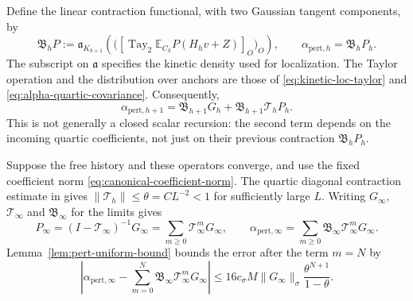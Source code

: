 \documentclass[11pt]{article}
\newcommand{\E}{\mathbb E}
\newcommand{\Tay}{\operatorname{Tay}}
\numberwithin{equation}{section}
\theoremstyle{definition}
\theoremstyle{plain}
\begin{document}
Define the linear contraction functional, with two Gaussian
tangent components, by
\begin{equation}
 \mathfrak B_hP
 :=\mathfrak a_{K_{h+1}}\!\left(
       \bigl([\Tay_2\E_{C_h}P(H_hv+Z)]_O\bigr)_O\right),
 \qquad \alpha_{\mathrm{pert},h}=\mathfrak B_hP_h.
 \label{eq:quartic-history-contraction}
\end{equation}
The subscript on $\mathfrak a$ specifies the kinetic density
used for localization.  The Taylor operation and the distribution
over anchors are those of \eqref{eq:kinetic-loc-taylor} and
\eqref{eq:alpha-quartic-covariance}.  Consequently,
\begin{equation}
 \alpha_{\mathrm{pert},h+1}
   =\mathfrak B_{h+1}G_h
       +\mathfrak B_{h+1}\mathcal T_hP_h.
 \label{eq:quartic-history-alpha-recursion}
\end{equation}
This is not generally a closed scalar recursion: the second term
depends on the incoming quartic coefficients, not just on their
previous contraction $\mathfrak B_hP_h$.

Suppose the free history and these operators converge, and use
the fixed coefficient norm \eqref{eq:canonical-coefficient-norm}.
The quartic diagonal contraction estimate in
\cite[Section~5.5]{OpenAI-O3} gives
$\|\mathcal T_h\|\le\theta=CL^{-2}<1$ for sufficiently large $L$.
Writing $G_\infty$, $\mathcal T_\infty$ and
$\mathfrak B_\infty$ for the limits gives
\begin{equation}
 P_\infty=(I-\mathcal T_\infty)^{-1}G_\infty
     =\sum_{m\ge0}\mathcal T_\infty^mG_\infty,\qquad
 \alpha_{\mathrm{pert},\infty}
     =\sum_{m\ge0}\mathfrak B_\infty
                             \mathcal T_\infty^mG_\infty.
 \label{eq:quartic-history-neumann}
\end{equation}
Lemma~\ref{lem:pert-uniform-bound} bounds the error after the term
$m=N$ by
\begin{equation}
 \left|\alpha_{\mathrm{pert},\infty}
       -\sum_{m=0}^N\mathfrak B_\infty
                                  \mathcal T_\infty^mG_\infty\right|
 \le16c_\sigma M\|G_\infty\|_\sigma
                       \frac{\theta^{N+1}}{1-\theta}.
 \label{eq:quartic-history-tail}
\end{equation}
\end{document}
